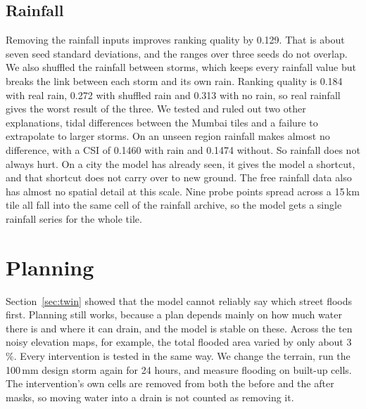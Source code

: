 \documentclass[conference]{IEEEtran}
\begin{document}
\subsection{Rainfall}
Removing the rainfall inputs improves ranking quality by 0.129. That is about seven seed standard
deviations, and the ranges over three seeds do not overlap. We also shuffled the rainfall between
storms, which keeps every rainfall value but breaks the link between each storm and its own rain.
Ranking quality is 0.184 with real rain, 0.272 with shuffled rain and 0.313 with no rain, so real
rainfall gives the worst result of the three. We tested and ruled out two other explanations, tidal
differences between the Mumbai tiles and a failure to extrapolate to larger storms. On an unseen
region rainfall makes almost no difference, with a CSI of 0.1460 with rain and 0.1474 without. So
rainfall does not always hurt. On a city the model has already seen, it gives the model a shortcut,
and that shortcut does not carry over to new ground. The free rainfall data also has almost no
spatial detail at this scale. Nine probe points spread across a 15\,km tile all fall into the same
cell of the rainfall archive, so the model gets a single rainfall series for the whole tile.

\section{Planning}
\label{sec:planning}
Section~\ref{sec:twin} showed that the model cannot reliably say which street floods first.
Planning still works, because a plan depends mainly on how much water there is and where it can
drain, and the model is stable on these. Across the ten noisy elevation maps, for example, the total
flooded area varied by only about 3\,\%. Every intervention is tested in the same way. We change the
terrain, run the 100\,mm design storm again for 24 hours, and measure flooding on built-up cells. The
intervention's own cells are removed from both the before and the after masks, so moving water into
a drain is not counted as removing it.
\end{document}
